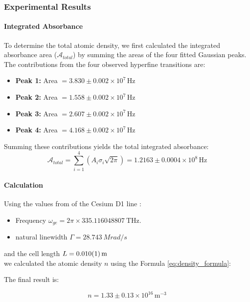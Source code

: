 \subsubsection{Experimental Results}

\paragraph{Integrated Absorbance}
To determine the total atomic density, we first calculated the integrated absorbance area ($\mathcal{A}_{total}$) by summing the areas of the four fitted Gaussian peaks. 
The contributions from the four observed hyperfine transitions are:
\begin{itemize}
    \item \textbf{Peak 1:} Area $= 3.830 \pm 0.002 \times 10^7 \, \text{Hz}$ 
    \item \textbf{Peak 2:} Area $= 1.558 \pm 0.002 \times 10^7 \, \text{Hz}$
    \item \textbf{Peak 3:} Area $= 2.607 \pm 0.002 \times 10^7 \, \text{Hz}$
    \item \textbf{Peak 4:} Area $= 4.168 \pm 0.002 \times 10^7 \, \text{Hz}$
\end{itemize}

Summing these contributions yields the total integrated absorbance:
\begin{equation}
    \mathcal{A}_{total} = \sum_{i=1}^{4} (A_i \sigma_i \sqrt{2\pi}) = 1.2163 \pm 0.0004 \times 10^8 \, \text{Hz}
\end{equation}

\paragraph{Calculation}
Using the values from of the Cesium D1 line \cite{Steck_Quantum_Optics}:
\begin{itemize}
    \item Frequency $\omega_{ge} = 2\pi \times \SI{335.116 048 807}{\tera\hertz}$.
    \item natural linewidth $\Gamma = \SI{28.743}{Mrad/s}$
\end{itemize}

and the cell length $L = \SI{0.01\pm0.001}{\meter}$ \\
we calculated the atomic density $n$ using the Formula \ref{eq:density_formula}:

The final result is:

\begin{equation}
    n = 1.33 \pm 0.13 \times 10^{16} \, \text{m}^{-3}
\end{equation}

